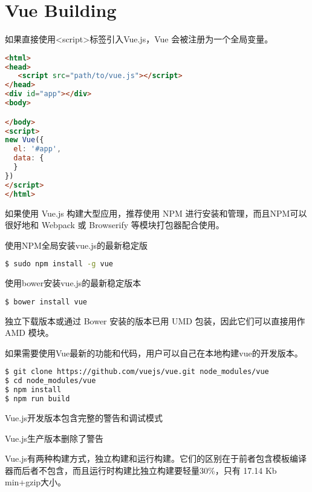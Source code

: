 \section{Vue Building}


如果直接使用<script>标签引入Vue.js，Vue 会被注册为一个全局变量。

\begin{lstlisting}[language=HTML]
<html>
<head>
   <script src="path/to/vue.js"></script>
</head>
<div id="app"></div>
<body>

</body>
<script>
new Vue({
  el: '#app',
  data: {
  }
})
</script>
</html>
\end{lstlisting}



如果使用 Vue.js 构建大型应用，推荐使用 NPM 进行安装和管理，而且NPM可以很好地和 Webpack 或 Browserify 等模块打包器配合使用。

\begin{compactitem}
\item 使用NPM全局安装vue.js的最新稳定版

\begin{lstlisting}[language=bash]
$ sudo npm install -g vue
\end{lstlisting}

\item 使用bower安装vue.js的最新稳定版本

\begin{lstlisting}[language=bash]
$ bower install vue
\end{lstlisting}
\end{compactitem}

独立下载版本或通过 Bower 安装的版本已用 UMD 包装，因此它们可以直接用作 AMD 模块。



如果需要使用Vue最新的功能和代码，用户可以自己在本地构建vue的开发版本。


\begin{lstlisting}[language=bash]
$ git clone https://github.com/vuejs/vue.git node_modules/vue
$ cd node_modules/vue
$ npm install
$ npm run build
\end{lstlisting}

\begin{compactitem}
\item Vue.js开发版本包含完整的警告和调试模式
\item Vue.js生产版本删除了警告
\end{compactitem}


Vue.js有两种构建方式，独立构建和运行构建。它们的区别在于前者包含模板编译器而后者不包含，而且运行时构建比独立构建要轻量30\%，只有 17.14 Kb min+gzip大小。


